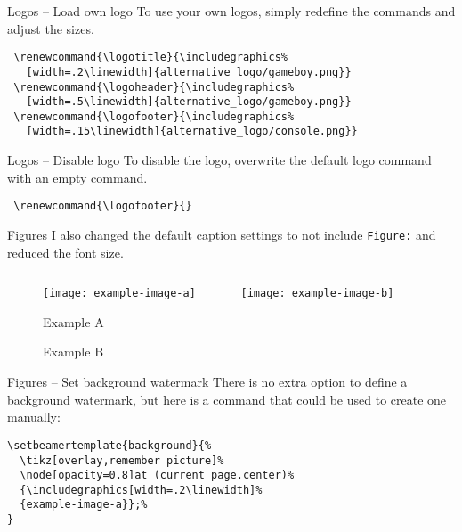 \documentclass[aspectratio=169]{beamer}
\begin{document}
\begin{frame}[fragile]{Logos -- Load own logo}
  To use your own logos, simply redefine the commands and adjust the sizes.
  \begin{verbatim}
 \renewcommand{\logotitle}{\includegraphics%
   [width=.2\linewidth]{alternative_logo/gameboy.png}}
 \renewcommand{\logoheader}{\includegraphics%
   [width=.5\linewidth]{alternative_logo/gameboy.png}}
 \renewcommand{\logofooter}{\includegraphics%
   [width=.15\linewidth]{alternative_logo/console.png}}
  \end{verbatim}
\end{frame}

\begin{frame}[fragile]{Logos -- Disable logo}
  To disable the logo, overwrite the default logo command with an empty
  command.
  \begin{verbatim}
 \renewcommand{\logofooter}{}
  \end{verbatim}
\end{frame}

\begin{frame}{Figures}
  I also changed the default caption settings to not
  include \texttt{Figure:} and reduced the font size.
  \begin{figure}[H]
    \centering
    \begin{columns}[T]
      \begin{column}{.3\linewidth}
        \texttt{[image: example-image-a]}
        \caption{Example A}
      \end{column}
      \begin{column}{.3\linewidth}
        \texttt{[image: example-image-b]}
        \caption{Example B}
      \end{column}
    \end{columns}
  \end{figure}
\end{frame}

\begin{frame}[fragile]{Figures -- Set background watermark}
  There is no extra option to define a background watermark, but here
  is a command that could be used to create one manually:
  \vfill
  \begin{verbatim}
\setbeamertemplate{background}{%
  \tikz[overlay,remember picture]%
  \node[opacity=0.8]at (current page.center)%
  {\includegraphics[width=.2\linewidth]%
  {example-image-a}};%
}
  \end{verbatim}
\end{frame}
\end{document}

